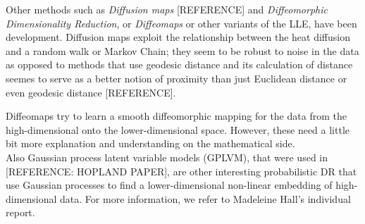 \documentclass[journal, a4paper]{IEEEtran}
\begin{document}
Other methods such as \textit{Diffusion maps} [REFERENCE] and \textit{Diffeomorphic Dimensionality Reduction}, or \textit{Diffeomaps} or other variants of the LLE, have been development. 
Diffusion maps exploit the relationship between the heat diffusion and a random walk or Markov Chain; 
they seem to be robust to noise in the data as opposed to methods that use geodesic distance and its calculation of distance seemes to serve as a better notion of proximity than just Euclidean distance or even geodesic distance [REFERENCE].

Diffeomaps try to learn a smooth diffeomorphic mapping for the data from the high-dimensional onto the lower-dimensional space. However, these need a little bit more explanation and understanding on the mathematical side. \\

Also Gaussian process latent variable models (GPLVM), that were used in [REFERENCE: HOPLAND PAPER], are other interesting probabilistic DR that use Gaussian processes to find a lower-dimensional non-linear embedding of high-dimensional data. For more information, we refer to Madeleine Hall's individual report.


\end{document}
